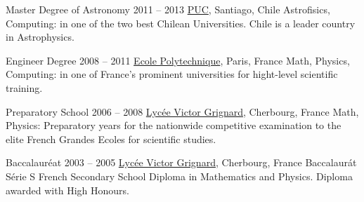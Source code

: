 


\begin{coordinatelist}
\end{coordinatelist}




\begin{yearlist}
\item[Master Degree of Astronomy]{2011 -- 2013}
	{\href{http://www.uc.cl/}{PUC}, Santiago, Chile}
    {Astrofisics, Computing: in one of the two best Chilean Universities. 
    Chile is a leader country in Astrophysics.}
    

\item[Engineer Degree]{2008 -- 2011}
	{\href{https://www.polytechnique.edu/}{Ecole Polytechnique}, Paris, France}
    {Math, Physics, Computing: in one of France's prominent universities for hight-­level scientific training.}


\item[Preparatory School]{2006 -- 2008}
	{\href{http://www.lycee-grignard.fr/}{Lyc\'ee Victor Grignard}, Cherbourg, France}
	{Math, Physics: Preparatory years for the nationwide competitive examination to the elite French Grandes Ecoles for scientific studies.}


\item[Baccalaur\'eat]{2003 -- 2005}
	{\href{http://www.lycee-grignard.fr/}{Lyc\'ee Victor Grignard}, Cherbourg, France}
	{Baccalaur\'at S\'erie S French Secondary School Diploma in Mathematics and Physics. 
    Diploma awarded with High Honours.}
\end{yearlist}


